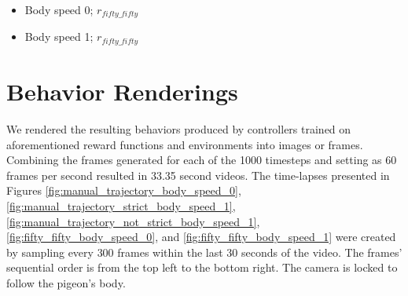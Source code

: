 \begin{itemize}
    \item Body speed 0; $r_{fifty\_fifty}$

    \item Body speed 1; $r_{fifty\_fifty}$

  \end{itemize}




\section{Behavior Renderings}
  We rendered the resulting behaviors produced by controllers trained on aforementioned reward functions and environments into images or frames.
  Combining the frames generated for each of the 1000 timesteps and setting as 60 frames per second resulted in 33.35 second videos.
  The time-lapses presented in Figures \ref{fig:manual_trajectory_body_speed_0}, \ref{fig:manual_trajectory_strict_body_speed_1}, \ref{fig:manual_trajectory_not_strict_body_speed_1}, \ref{fig:fifty_fifty_body_speed_0}, and \ref{fig:fifty_fifty_body_speed_1} were created by sampling every $300$ frames within the last 30 seconds of the video.
  The frames' sequential order is from the top left to the bottom right.
  The camera is locked to follow the pigeon's body.

